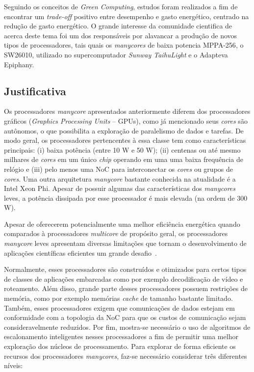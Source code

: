 \documentclass[a4paper,11pt]{article}
\newcommand{\mppa}{MPPA-256\xspace}
\newcommand{\epiphany}{Adapteva Epiphany\xspace}
\begin{document}
Seguindo os conceitos de \textit{Green Computing}, estudos foram realizados a fim de encontrar um \textit{trade-off} positivo entre desempenho e gasto energético, centrado na redução de gasto energético. O grande interesse da comunidade cientifica de \hpc acerca deste tema foi um dos responsáveis por alavancar a produção de novos tipos de processadores, tais quais os \textit{manycores} de baixa potencia \mppa \cite{MPPA-2:2013}, o SW26010, utilizado no supercomputador \textit{Sunway TaihuLight} \cite{sunway:2016} e o \epiphany  \cite{Olofsson2014}.


\subsection{Justificativa}

Os processadores \emph{manycore} apresentados anteriormente diferem dos processadores gráficos (\emph{Graphics Processing Units} -- GPUs), como já mencionado seus \emph{cores} são autônomos, o que possibilita a exploração de paralelismo de dados e tarefas. De modo geral, os processadores pertencentes à essa classe tem como características principais: (i) baixa potência (entre 10 W e 50 W); (ii) centenas ou até mesmo milhares de \emph{cores} em um único \emph{chip} operando em uma uma baixa frequência de relógio e (iii) pelo menos uma NoC para interconectar os \emph{cores} ou grupos de \emph{cores}. Uma outra arquitetura \emph{manycore} bastante conhecida na atualidade é a Intel Xeon Phi. Apesar de possuir algumas das características dos \emph{manycores} leves, a potência dissipada por esse processador é mais elevada (na ordem de 300 W). 

Apesar de oferecerem potencialmente uma melhor eficiência energética quando comparados à processadores \emph{multicore} de propósito geral, os processadores \emph{manycore} leves apresentam diversas limitações que tornam o desenvolvimento de aplicações científicas eficientes um grande desafio~\cite{Castro:2013:ACE:2535753.2535757}.

Normalmente, esses processadores são construídos e otimizados para certos tipos de classes de aplicações embarcadas como por exemplo decodificação de vídeo e roteamento. Além disso, grande parte desses processadores possuem restrições de memória, como por exemplo memórias \emph{cache} de tamanho bastante limitado. Também, esses processadores exigem que comunicações de dados estejam em conformidade com a topologia da NoC para que os custos de comunicação sejam consideravelmente reduzidos. Por fim, mostra-se necessário o uso de algoritmos de escalonamento inteligentes nesses processadores a fim de permitir uma melhor exploração dos núcleos de processamento. Para explorar de forma eficiente os recursos dos processadores \emph{manycores}, faz-se necessário considerar três diferentes níveis:
\end{document}
